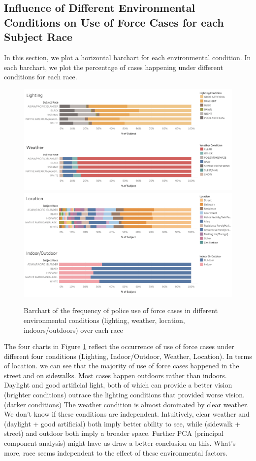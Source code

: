 \documentclass[10pt]{article}
\begin{document}
\subsection{Influence of Different Environmental Conditions on Use of Force Cases for each Subject Race}

In this section, we plot a horizontal barchart for each environmental condition. In each barchart, we plot the percentage of cases happening under different conditions for each race.

\begin{figure}[h]
\centering
\includegraphics[scale=0.35]{image2.png}
\includegraphics[scale=0.35]{image4.png}
\caption{Barchart of the frequency of police use of force cases in different environmental conditions (lighting, weather, location, indoors/outdoors) over each race}
\label{fig:conds}
\end{figure}


The four charts in Figure \ref{fig:conds} reflect the occurrence of use of force cases under different four conditions (Lighting, Indoor/Outdoor, Weather, Location). In terms of location. we can see that the majority of use of force cases happened in the street and on sidewalks. Most cases happen outdoors rather than indoors. Daylight and good artificial light, both of which can provide a better vision (brighter conditions) outrace the lighting conditions that provided worse vision. (darker conditions) The weather condition is almost dominated by clear weather. We don't know if these conditions are independent. Intuitively, clear weather and (daylight + good artificial) both imply better ability to see, while (sidewalk + street) and outdoor both imply a broader space. Further PCA (principal component analysis) might have us draw a better conclusion on this. What's more, race seems independent to the effect of these environmental factors.
\end{document}
